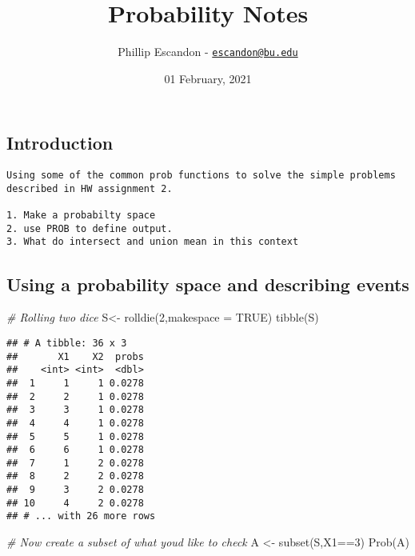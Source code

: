\documentclass[
]{article}
\title{Probability Notes}
\author{Phillip Escandon -
\href{mailto:escandon@bu.edu}{\nolinkurl{escandon@bu.edu}}}
\date{01 February, 2021}
\newenvironment{Shaded}{\begin{snugshade}}{\end{snugshade}}
\newcommand{\AttributeTok}[1]{\textcolor[rgb]{0.77,0.63,0.00}{#1}}
\newcommand{\CommentTok}[1]{\textcolor[rgb]{0.56,0.35,0.01}{\textit{#1}}}
\newcommand{\ConstantTok}[1]{\textcolor[rgb]{0.00,0.00,0.00}{#1}}
\newcommand{\DecValTok}[1]{\textcolor[rgb]{0.00,0.00,0.81}{#1}}
\newcommand{\FunctionTok}[1]{\textcolor[rgb]{0.00,0.00,0.00}{#1}}
\newcommand{\NormalTok}[1]{#1}
\newcommand{\OtherTok}[1]{\textcolor[rgb]{0.56,0.35,0.01}{#1}}
\newcommand{\SpecialCharTok}[1]{\textcolor[rgb]{0.00,0.00,0.00}{#1}}
\begin{document}
\maketitle

{
\setcounter{tocdepth}{2}
\tableofcontents
}
\hypertarget{introduction}{%
\subsection{Introduction}\label{introduction}}

\begin{verbatim}
Using some of the common prob functions to solve the simple problems described in HW assignment 2.

1. Make a probabilty space
2. use PROB to define output.
3. What do intersect and union mean in this context
\end{verbatim}

\hypertarget{using-a-probability-space-and-describing-events}{%
\subsection{Using a probability space and describing
events}\label{using-a-probability-space-and-describing-events}}

\begin{Shaded}
\begin{Highlighting}[]
\CommentTok{\# Rolling  two dice }
\NormalTok{S}\OtherTok{\textless{}{-}} \FunctionTok{rolldie}\NormalTok{(}\DecValTok{2}\NormalTok{,}\AttributeTok{makespace =} \ConstantTok{TRUE}\NormalTok{)}
\FunctionTok{tibble}\NormalTok{(S)}
\end{Highlighting}
\end{Shaded}

\begin{verbatim}
## # A tibble: 36 x 3
##       X1    X2  probs
##    <int> <int>  <dbl>
##  1     1     1 0.0278
##  2     2     1 0.0278
##  3     3     1 0.0278
##  4     4     1 0.0278
##  5     5     1 0.0278
##  6     6     1 0.0278
##  7     1     2 0.0278
##  8     2     2 0.0278
##  9     3     2 0.0278
## 10     4     2 0.0278
## # ... with 26 more rows
\end{verbatim}

\begin{Shaded}
\begin{Highlighting}[]
\CommentTok{\# Now create a subset of what you\textquotesingle{}d like to check}
\NormalTok{A }\OtherTok{\textless{}{-}} \FunctionTok{subset}\NormalTok{(S,X1}\SpecialCharTok{==}\DecValTok{3}\NormalTok{)}
\FunctionTok{Prob}\NormalTok{(A)}
\end{Highlighting}
\end{Shaded}
\end{document}
